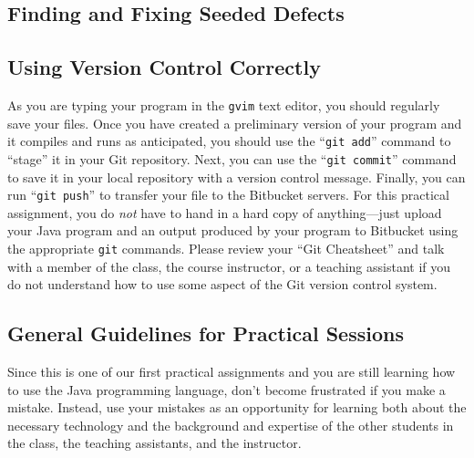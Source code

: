 \subsection*{Finding and Fixing Seeded Defects}


\subsection*{Using Version Control Correctly}

As you are typing your program in the {\tt gvim} text editor, you should regularly save your files.  Once you have
created a preliminary version of your program and it compiles and runs as anticipated, you should use the ``{\tt git
add}'' command to ``stage'' it in your Git repository.  Next, you can use the ``{\tt git commit}'' command to save it in
your local repository with a version control message.  Finally, you can run ``{\tt git push}'' to transfer your file to
the Bitbucket servers.  For this practical assignment, you do {\em not} have to hand in a hard copy of anything---just
upload your Java program and an output produced by your program to Bitbucket using the appropriate {\tt git} commands.
Please review your ``Git Cheatsheet'' and talk with a member of the class, the course instructor, or a teaching
assistant if you do not understand how to use some aspect of the Git version control system.

\vspace*{-.2in}
\subsection*{General Guidelines for Practical Sessions}

Since this is one of our first practical assignments and you are still learning how to use the Java programming
language, don't become frustrated if you make a mistake. Instead, use your mistakes as an opportunity for learning both
about the necessary technology and the background and expertise of the other students in the class, the teaching
assistants, and the instructor.


